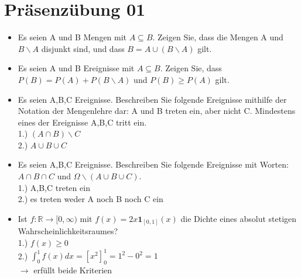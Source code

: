 \documentclass[paper=a4, fontsize=11pt]{scrartcl}
\numberwithin{equation}{section}
\numberwithin{figure}{section}
\numberwithin{table}{section}
\begin{document}
\section{Präsenzübung 01}
 \begin{itemize}
 \item Es seien A und B Mengen mit $A \subseteq B$. Zeigen Sie, dass die Mengen A und $B \backslash A$ disjunkt sind, und dass $B= A \cup (B \backslash A)$ gilt. \\
 \item Es seien A und B Ereignisse mit $A \subseteq B$. Zeigen Sie, dass $P(B)=P(A)+P(B \backslash A)$ und $P(B) \geq P(A)$ gilt. \\
 \item Es seien A,B,C Ereignisse. Beschreiben Sie folgende Ereignisse mithilfe der Notation der Mengenlehre dar: A und B treten ein, aber nicht C. Mindestens eines der Ereignisse A,B,C tritt ein. \\
 1.) $(A \cap B) \backslash C$ \\
 2.) $A \cup B \cup C$
\item Es seien A,B,C Ereignisse. Beschreiben Sie folgende Ereignisse mit Worten: $A \cap B \cap C$ und $\Omega \backslash (A \cup B \cup C)$. \\
1.) A,B,C treten ein \\
2.) es treten weder A noch B noch C  ein 
 \item Ist $f: \mathbb{R} \rightarrow [0, \infty)$ mit $f(x)=2x \textbf{1} _{[0,1]}(x)$ die Dichte eines absolut stetigen Wahrscheinlichkeitsraumes? \\
 1.) $f(x) \geq 0$ \\
 2.) $\int^{1}_{0} f(x) dx = [x^{2}]_{0}^{1}=1^{2}-0^{2}=1$ \\
 $\rightarrow$ erfüllt beide Kriterien
 \end{itemize}
\end{document}
